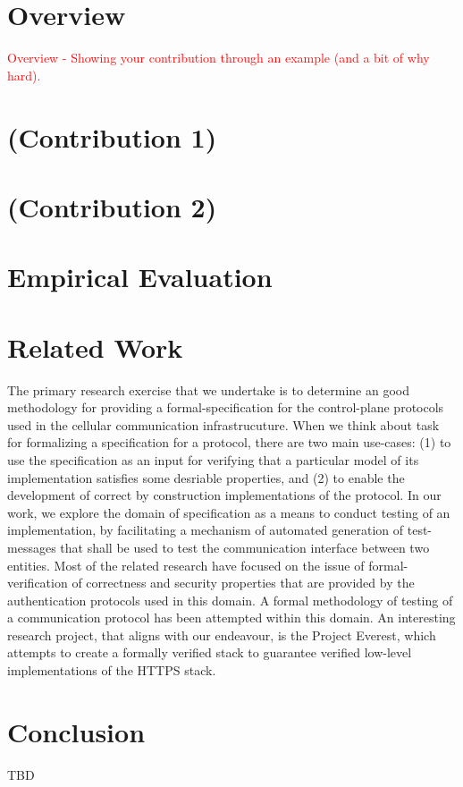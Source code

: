 \documentclass[acmsmall,review,authorversion]{acmart}
\begin{document}
\section{Overview}
\textcolor{red}{
Overview
- Showing your contribution through an example (and a bit of why hard).
}

\section{(Contribution 1)}

\section{(Contribution 2)}

\section{Empirical Evaluation}

\section{Related Work}
  The primary research exercise that we undertake is to determine an good methodology for providing a formal-specification for the control-plane protocols used in the cellular communication infrastrucuture. When we think about task for formalizing a specification for a protocol, there are two main use-cases: (1) to use the specification as an input for verifying that a particular model of its implementation satisfies some desriable properties, and (2) to enable the development of correct by construction implementations of the protocol. In our work, we explore the domain of specification as a means to conduct testing of an implementation, by facilitating a mechanism of automated generation of test-messages that shall be used to test the communication interface between two entities. Most of the related research have focused on the issue of formal-verification of correctness and security properties that are provided by the authentication protocols used in this domain. A formal methodology of testing of a communication protocol has been attempted within this domain. An interesting research project, that aligns with our endeavour, is the Project Everest, which attempts to create a formally verified stack to guarantee verified low-level implementations of the HTTPS stack. 
  
\section{Conclusion}

\begin{acks}
TBD
\end{acks}



\end{document}
